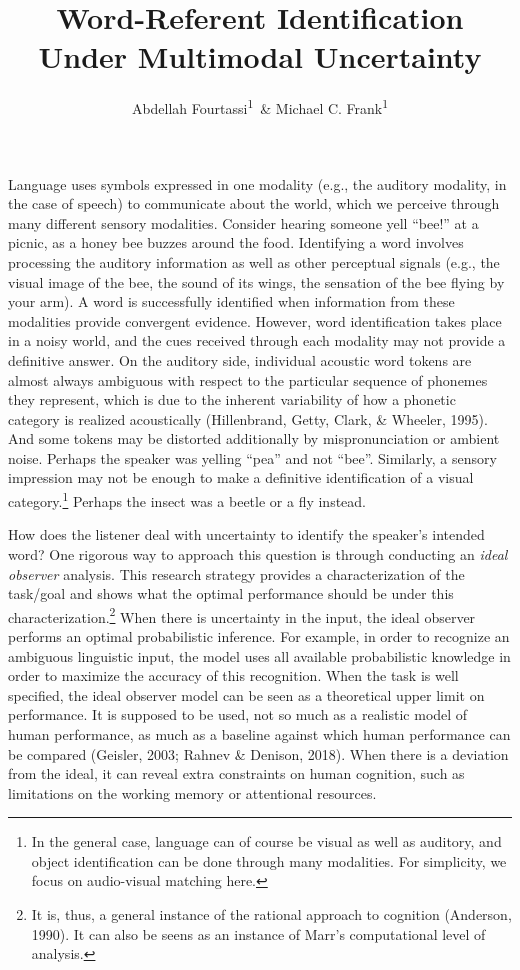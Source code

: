 \documentclass[english,floatsintext,man]{apa6}
\title{Word-Referent Identification Under Multimodal Uncertainty}
\author{Abdellah Fourtassi\textsuperscript{1}~\& Michael C. Frank\textsuperscript{1}}
\affiliation{
    \vspace{0.5cm}
          \textsuperscript{1} Department of Psychology, Stanford University  }
\theoremstyle{definition}
\theoremstyle{definition}
\theoremstyle{definition}
\theoremstyle{remark}
\begin{document}
\maketitle

\setcounter{secnumdepth}{0}



Language uses symbols expressed in one modality (e.g., the auditory
modality, in the case of speech) to communicate about the world, which
we perceive through many different sensory modalities. Consider hearing
someone yell \enquote{bee!} at a picnic, as a honey bee buzzes around
the food. Identifying a word involves processing the auditory
information as well as other perceptual signals (e.g., the visual image
of the bee, the sound of its wings, the sensation of the bee flying by
your arm). A word is successfully identified when information from these
modalities provide convergent evidence. However, word identification
takes place in a noisy world, and the cues received through each
modality may not provide a definitive answer. On the auditory side,
individual acoustic word tokens are almost always ambiguous with respect
to the particular sequence of phonemes they represent, which is due to
the inherent variability of how a phonetic category is realized
acoustically (Hillenbrand, Getty, Clark, \& Wheeler, 1995). And some
tokens may be distorted additionally by mispronunciation or ambient
noise. Perhaps the speaker was yelling \enquote{pea} and not
\enquote{bee}. Similarly, a sensory impression may not be enough to make
a definitive identification of a visual
category.\footnote{In the general case, language can of course be visual as well as auditory, and object identification can be done through many modalities. For simplicity, we focus on audio-visual matching here.}
Perhaps the insect was a beetle or a fly instead.

How does the listener deal with uncertainty to identify the speaker's
intended word? One rigorous way to approach this question is through
conducting an \emph{ideal observer} analysis. This research strategy
provides a characterization of the task/goal and shows what the optimal
performance should be under this characterization.\footnote{It is, thus,
  a general instance of the rational approach to cognition (Anderson,
  1990). It can also be seens as an instance of Marr's computational
  level of analysis.} When there is uncertainty in the input, the ideal
observer performs an optimal probabilistic inference. For example, in
order to recognize an ambiguous linguistic input, the model uses all
available probabilistic knowledge in order to maximize the accuracy of
this recognition. When the task is well specified, the ideal observer
model can be seen as a theoretical upper limit on performance. It is
supposed to be used, not so much as a realistic model of human
performance, as much as a baseline against which human performance can
be compared (Geisler, 2003; Rahnev \& Denison, 2018). When there is a
deviation from the ideal, it can reveal extra constraints on human
cognition, such as limitations on the working memory or attentional
resources.
\end{document}
